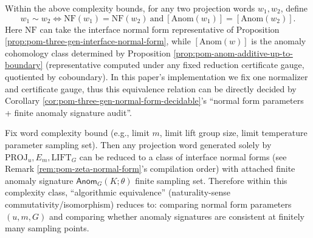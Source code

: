 \begin{definition}\label{def:pom-algorithmic-equivalence-nf-anom}
Within the above complexity bounds, for any two projection words \(w_1,w_2\), define
\[
w_1\sim w_2
\iff
\mathrm{NF}(w_1)=\mathrm{NF}(w_2)
\ \text{and}\
[\mathrm{Anom}(w_1)]=[\mathrm{Anom}(w_2)].
\]
Here \(\mathrm{NF}\) can take the interface normal form representative of Proposition \ref{prop:pom-three-gen-interface-normal-form}, while \([\mathrm{Anom}(w)]\) is the anomaly cohomology class determined by Proposition \ref{prop:pom-anom-additive-up-to-boundary} (representative computed under any fixed reduction certificate gauge, quotiented by coboundary).
In this paper's implementation we fix one normalizer and certificate gauge, thus this equivalence relation can be directly decided by Corollary \ref{cor:pom-three-gen-normal-form-decidable}'s ``normal form parameters + finite anomaly signature audit''.
\end{definition}

\begin{corollary}\label{cor:pom-three-gen-normal-form-decidable}
Fix word complexity bound (e.g., limit \(m\), limit lift group size, limit temperature parameter sampling set).
Then any projection word generated solely by \(\mathrm{PROJ}_u,E_m,\mathrm{LIFT}_G\) can be reduced to a class of interface normal forms (see Remark \ref{rem:pom-zeta-normal-form}'s compilation order) with attached finite anomaly signature
\(
\mathsf{Anom}_G(K;\theta)
\)
finite sampling set.
Therefore within this complexity class, ``algorithmic equivalence'' (naturality-sense commutativity/isomorphism) reduces to:
comparing normal form parameters \((u,m,G)\) and comparing whether anomaly signatures are consistent at finitely many sampling points.
\end{corollary}

